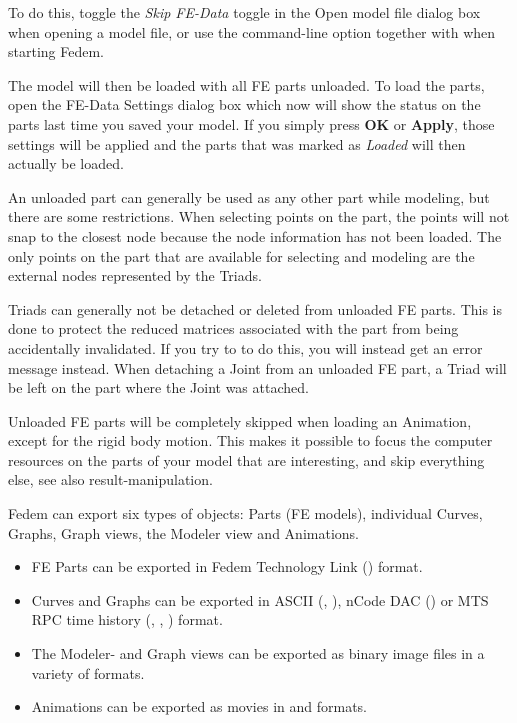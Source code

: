 To do this, toggle the {\sl Skip FE-Data} toggle in the Open model file dialog
box when opening a model file, or use the  command-line option
together with  when starting Fedem.

The model will then be loaded with all FE parts unloaded. To load the parts,
open the FE-Data Settings dialog box which now will show the status on the
parts last time you saved your model. If you simply press \textbf{OK} or
\textbf{Apply}, those settings will be applied and the parts that was marked as
{\sl Loaded} will then actually be loaded.



An unloaded part can generally be used as any other part while modeling,
but there are some restrictions.
When selecting points on the part, the points will not snap to the closest node
because the node information has not been loaded.
The only points on the part that are available for selecting and modeling are
the external nodes represented by the Triads.

Triads can generally not be detached or deleted from unloaded FE parts.
This is done to protect the reduced matrices associated with the part
from being accidentally invalidated.
If you try to to do this, you will instead get an error message instead.
When detaching a Joint from an unloaded FE part,
a Triad will be left on the part where the Joint was attached.



Unloaded FE parts will be completely skipped when loading an Animation,
except for the rigid body motion. This makes it possible to focus the
computer resources on the parts of your model that are interesting,
and skip everything else, see also
{result-manipulation}.



Fedem can export six types of objects: Parts (FE models), individual
Curves, Graphs, Graph views, the Modeler view and Animations.

\begin{itemize}
\item FE Parts can be exported in Fedem Technology Link () format.
\item Curves and Graphs can be exported in ASCII (, ),
  nCode DAC () or MTS RPC time history (, ,
  ) format.
\item The Modeler- and Graph views can be exported as binary image files
  in a variety of formats.
\item Animations can be exported as movies
  in  and  formats.
\end{itemize}


